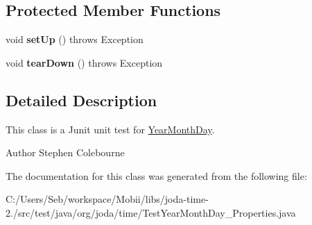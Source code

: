 \subsection*{Protected Member Functions}
\begin{DoxyCompactItemize}
\item 
\hypertarget{classorg_1_1joda_1_1time_1_1_test_year_month_day___properties_a0849b6bb7f530a6bb6ee49d3668a9457}{void {\bfseries set\-Up} ()  throws Exception }\label{classorg_1_1joda_1_1time_1_1_test_year_month_day___properties_a0849b6bb7f530a6bb6ee49d3668a9457}

\item 
\hypertarget{classorg_1_1joda_1_1time_1_1_test_year_month_day___properties_a70321bf765bdcd5e5fa6efc7a32df945}{void {\bfseries tear\-Down} ()  throws Exception }\label{classorg_1_1joda_1_1time_1_1_test_year_month_day___properties_a70321bf765bdcd5e5fa6efc7a32df945}

\end{DoxyCompactItemize}


\subsection{Detailed Description}
This class is a Junit unit test for \hyperlink{classorg_1_1joda_1_1time_1_1_year_month_day}{Year\-Month\-Day}.

\begin{DoxyAuthor}{Author}
Stephen Colebourne 
\end{DoxyAuthor}


The documentation for this class was generated from the following file\-:\begin{DoxyCompactItemize}
\item 
C\-:/\-Users/\-Seb/workspace/\-Mobii/libs/joda-\/time-\/2./src/test/java/org/joda/time/Test\-Year\-Month\-Day\-\_\-\-Properties.\-java\end{DoxyCompactItemize}
